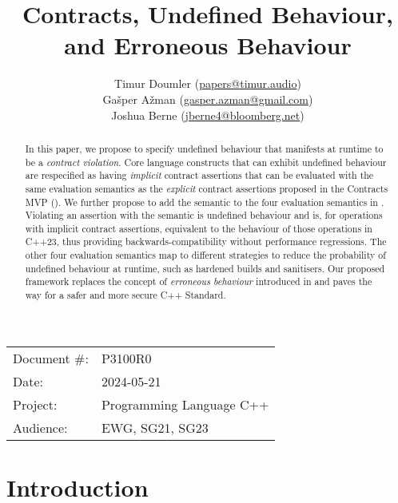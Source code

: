 

 \usepackage[bottom]{footmisc} 


\title{Contracts, Undefined Behaviour, and Erroneous Behaviour}
\author{ Timur Doumler \small(\href{mailto:papers@timur.audio}{papers@timur.audio})  \\
Ga\v sper A\v zman \small(\href{mailto:gasper.azman@gmail.com}{gasper.azman@gmail.com})   \\
Joshua Berne \small(\href{mailto:jberne4@bloomberg.net}{jberne4@bloomberg.net})  
}
\date{}
\maketitle

\begin{tabular}{ll}
Document \#: & P3100R0 \\
Date: &2024-05-21 \\
Project: & Programming Language C++ \\
Audience: & EWG, SG21, SG23
\end{tabular}

\begin{abstract}
In this paper, we propose to specify undefined behaviour that manifests at runtime to be a \emph{contract violation}. Core language constructs that can exhibit undefined behaviour are respecified as having \emph{implicit} contract assertions that can be evaluated with the same evaluation semantics as the \emph{explicit} contract assertions proposed in the Contracts MVP (\cite{P2900R7}). We further propose to add the  semantic to the four evaluation semantics in \cite{P2900R7}. Violating an assertion with the  semantic is undefined behaviour and is, for operations with implicit contract assertions, equivalent to the behaviour of those operations in C++23, thus providing backwards-compatibility without performance regressions. The other four evaluation semantics map to different strategies to reduce the probability of undefined behaviour at runtime, such as hardened builds and sanitisers. Our proposed framework replaces the concept of \emph{erroneous behaviour} introduced in \cite{P2795R5} and paves the way for a safer and more secure C++ Standard.
\end{abstract}

\section{Introduction}
\label{sec:intro}

